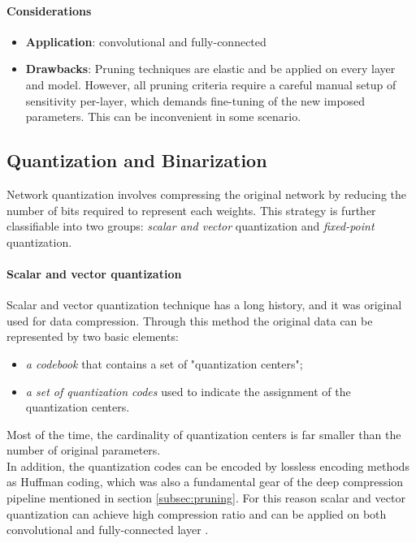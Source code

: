 \paragraph{Considerations}
\begin{itemize}
    \item \textbf{Application}: convolutional and fully-connected 
    
    \item \textbf{Drawbacks}: Pruning techniques are elastic and be applied on every layer and model. However, all pruning criteria require a careful manual setup of sensitivity per-layer, which demands fine-tuning of the new imposed parameters. This can be inconvenient in some scenario. 
\end{itemize}


\subsection{Quantization and Binarization}
Network quantization involves compressing the original network by reducing the number of bits required to represent each weights. This strategy is further classifiable into two groups: \emph{scalar and vector} quantization and \emph{fixed-point} quantization. 

\paragraph{Scalar and vector quantization}
Scalar and vector quantization technique has a long history, and it was original used for data compression. Through this method the original data can be represented by two basic elements: 
 \begin{itemize}
     \item \emph{a codebook} that contains a set of "quantization centers";
     
     \item \emph{a set of quantization codes} used to indicate the assignment of the quantization centers.
 \end{itemize}
 
 Most of the time, the cardinality of quantization centers is far smaller than the number of original parameters. 
 \\
 In addition, the quantization codes can be encoded by lossless encoding methods as Huffman coding, which was also a fundamental gear of the deep compression pipeline mentioned in section \ref{subsec:pruning}. For this reason scalar and vector quantization can achieve high compression ratio and can be applied on both convolutional \parencite{WU2016} and fully-connected layer \parencite{gong}. 

